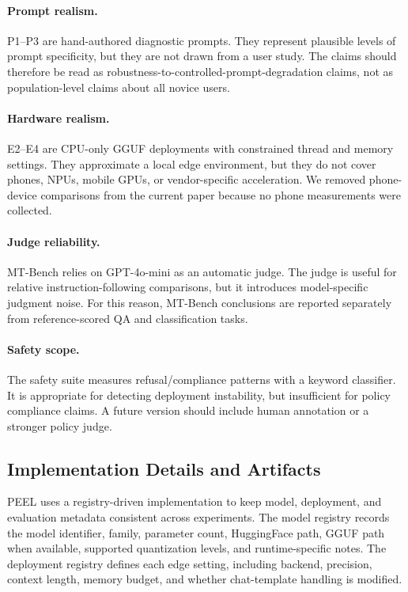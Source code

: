 \documentclass[letterpaper]{article}
\begin{document}
\paragraph{Prompt realism.}
P1--P3 are hand-authored diagnostic prompts. They represent plausible levels of
prompt specificity, but they are not drawn from a user study. The claims should
therefore be read as robustness-to-controlled-prompt-degradation claims, not as
population-level claims about all novice users.

\paragraph{Hardware realism.}
E2--E4 are CPU-only GGUF deployments with constrained thread and memory settings.
They approximate a local edge environment, but they do not cover phones,
NPUs, mobile GPUs, or vendor-specific acceleration. We removed phone-device
comparisons from the current paper because no phone measurements were collected.

\paragraph{Judge reliability.}
MT-Bench relies on GPT-4o-mini as an automatic judge. The judge is useful for
relative instruction-following comparisons, but it introduces model-specific
judgment noise. For this reason, MT-Bench conclusions are reported separately
from reference-scored QA and classification tasks.

\paragraph{Safety scope.}
The safety suite measures refusal/compliance patterns with a keyword classifier.
It is appropriate for detecting deployment instability, but insufficient for
policy compliance claims. A future version should include human annotation or a
stronger policy judge.

\subsection{Implementation Details and Artifacts}
\label{app:implementation}

PEEL uses a registry-driven implementation to keep model, deployment, and
evaluation metadata consistent across experiments. The model registry records
the model identifier, family, parameter count, HuggingFace path, GGUF path when
available, supported quantization levels, and runtime-specific notes. The
deployment registry defines each edge setting, including backend, precision,
context length, memory budget, and whether chat-template handling is modified.
\end{document}
